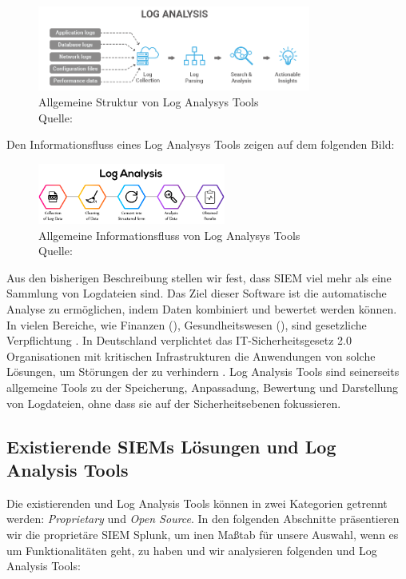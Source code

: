 \begin{figure}[H]
   \centering
   \includegraphics[width=0.8\textwidth]{assets/2.1_p2.png}
   \caption{Allgemeine Struktur von Log Analysys Tools\\Quelle: \citep{Tek-Tools_LGTArchitektur} }
   \centering
\end{figure}

Den Informationsfluss eines Log Analysys Tools zeigen auf dem folgenden Bild:

\begin{figure}[H]
   \centering
   \includegraphics[width=0.55\textwidth]{assets/2.2_p2.png}
   \caption{Allgemeine Informationsfluss von Log Analysys Tools\\Quelle: \citep{Neptune_LATInfoFluss} }
   \centering
\end{figure}

Aus den bisherigen Beschreibung stellen wir fest, dass \gls{SIEM} viel mehr als eine Sammlung von Logdateien sind. Das Ziel dieser Software ist die automatische Analyse zu ermöglichen, indem Daten kombiniert und bewertet werden können. In vielen Bereiche, wie Finanzen (), Gesundheitswesen (), sind  gesetzliche Verpflichtung \citep{Jog_SIEM}. In Deutschland verplichtet das \gls{IT-Sicherheitsgesetz 2.0} Organisationen mit kritischen Infrastrukturen die Anwendungen von solche Lösungen, um Störungen der  zu verhindern \citep{BSI_ITSG}. Log Analysis Tools sind seinerseits allgemeine Tools zu der Speicherung, Anpassadung, Bewertung und Darstellung von Logdateien, ohne dass sie auf der Sicherheitsebenen fokussieren.

\subsection{Existierende SIEMs Lösungen und Log Analysis Tools }
Die existierenden  und Log Analysis Tools können in zwei Kategorien getrennt werden: \textit{\gls{Proprietary}} und \textit{\gls{Open Source}}. In den folgenden Abschnitte präsentieren wir die proprietäre \gls{SIEM} Splunk, um inen Maßtab für unsere Auswahl, wenn es um Funktionalitäten geht, zu haben und wir analysieren folgenden  und Log Analysis Tools:

